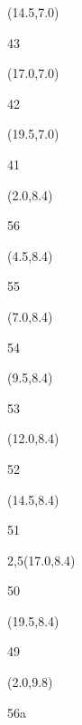 \documentclass[a4paper]{article}
\newcommand{\myseat}[5]{%
\vspace{-0.1cm} \hspace{-0.5cm}
\parbox[t][2.2cm][t]{3.5cm}{%
\small #1 %
\begin{description}
\vspace{-0.1cm}
\item [ID:] #2
\vspace{-0.1cm}
\item [Team:] #3 \normalsize
\vspace{-0.1cm}
\item \normalsize #4 #5
\vspace{-0.1cm}
\end{description}
}
}
\begin{document}
\begin{CJK}{UTF8}{cyberbit}
\begin{textblock}{2.5}(14.5,7.0)
\textblockcolor{}
\myseat{43}{}{}{}{}
\end{textblock}

\begin{textblock}{2.5}(17.0,7.0)
\textblockcolor{}
\myseat{42}{}{}{}{}
\end{textblock}

\begin{textblock}{2.5}(19.5,7.0)
\textblockcolor{}
\myseat{41}{}{}{}{}
\end{textblock}


\begin{textblock}{2.5}(2.0,8.4)
\textblockcolor{}
\myseat{56}{}{}{}{}
\end{textblock}

\begin{textblock}{2.5}(4.5,8.4)
\textblockcolor{}
\myseat{55}{}{}{}{}
\end{textblock}

\begin{textblock}{2.5}(7.0,8.4)
\textblockcolor{}
\myseat{54}{}{}{}{}
\end{textblock}

\begin{textblock}{2.5}(9.5,8.4)
\textblockcolor{}
\myseat{53}{}{}{}{}
\end{textblock}

\begin{textblock}{2.5}(12.0,8.4)
\textblockcolor{}
\myseat{52}{}{}{}{}
\end{textblock}

\begin{textblock}{2.5}(14.5,8.4)
\textblockcolor{}
\myseat{51}{}{}{}{}
\end{textblock}

\begin{textblock}{2,5}(17.0,8.4)
\textblockcolor{}
\myseat{50}{}{}{}{}
\end{textblock}

\begin{textblock}{2.5}(19.5,8.4)
\textblockcolor{}
\myseat{49}{}{}{}{}
\end{textblock}


\begin{textblock}{2.5}(2.0,9.8)
\textblockcolor{}
\myseat{56a}{}{}{}{}
\end{textblock}


\end{CJK}
\end{document}
